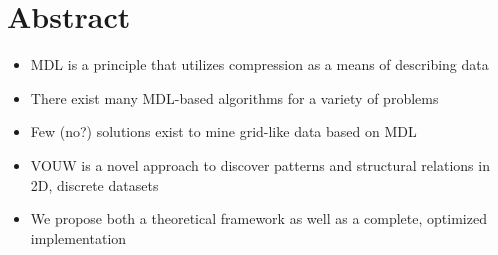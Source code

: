 \documentclass{llncs}
\begin{document}
\section*{Abstract}
\begin{itemize}
\item MDL is a principle that utilizes compression as a means of describing data
\item There exist many MDL-based algorithms for a variety of problems
\item Few (no?) solutions exist to mine grid-like data based on MDL
\item VOUW is a novel approach to discover patterns and structural relations in 2D, discrete datasets
\item We propose both a theoretical framework as well as a complete, optimized implementation 
\end{itemize}
\end{document}
